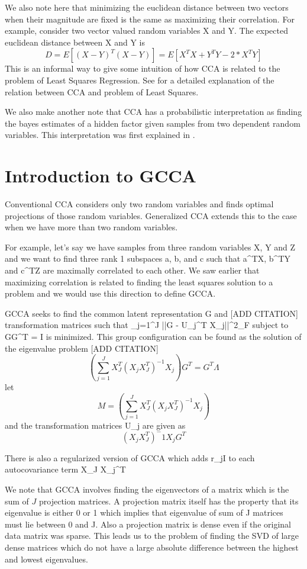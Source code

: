 \documentclass[11pt]{article}
\begin{document}
We also note here that minimizing the euclidean distance between two
vectors when their magnitude are fixed is the same as maximizing their
correlation. For example, consider two vector valued random variables X and Y. The
expected euclidean distance between X and Y is
$$D = E[(X-Y)^T(X-Y)] =  E[X^TX + Y^TY - 2 * X^TY] $$
This is an informal way to give some intuition of how CCA is related
to the problem of Least Squares Regression. See \cite{hastie2009elements} for a detailed
explanation of the relation between CCA and problem of Least Squares.

We also make another note that CCA has a probabilistic interpretation
as finding the bayes estimates of a hidden factor given samples from
two dependent random variables. This interpretation was first
explained in \cite{bach2005probabilistic}.

\section{Introduction to GCCA}
\label{sec:gcca}
Conventional CCA considers only two random variables and finds optimal
projections of those random variables. Generalized CCA extends this to
the case when we have more than two random variables.

For example, let's say we have samples from three random variables  X,
Y and Z and we want to find three rank 1 subspaces a, b, and c such
that a^TX, b^TY and c^TZ are maximally correlated to each other. We
saw earlier that maximizing correlation is related to finding the
least squares solution to a problem and we would use this direction to
define GCCA.

GCCA seeks to find the common latent representation G and [ADD CITATION]
transformation matrices such that
\sum_{j=1}^J ||G - U_j^T X_j||^2_F subject to GG^T = I is minimized.
This group configuration can be found as the solution of the
eigenvalue problem [ADD CITATION]
$$(\sum_{j=1}^J X_J^T(X_j X_J^T)^{-1}X_j)G^T = G^T \Lambda  $$
let $$M = (\sum_{j=1}^J X_J^T(X_j X_J^T)^{-1}X_j) $$
and the transformation matrices U_j are given as $$(X_j X_J^T)^-1 X_j
G^T$$

There is also a regularized version of GCCA which adds r_jI to each
autocovariance term X_J X_j^T

We note that GCCA involves finding the eigenvectors of a matrix which
is the sum of $J$ projection matrices. A projection matrix itself
has the property that its eigenvalue is either 0 or 1 which implies
that eigenvalue of sum of J matrices must lie between 0 and J. Also a
projection matrix is dense even if the original data matrix was
sparse. This leads us to the problem of finding the SVD of large dense
matrices which do not have a large absolute difference between the
highest and lowest eigenvalues.
\end{document}
